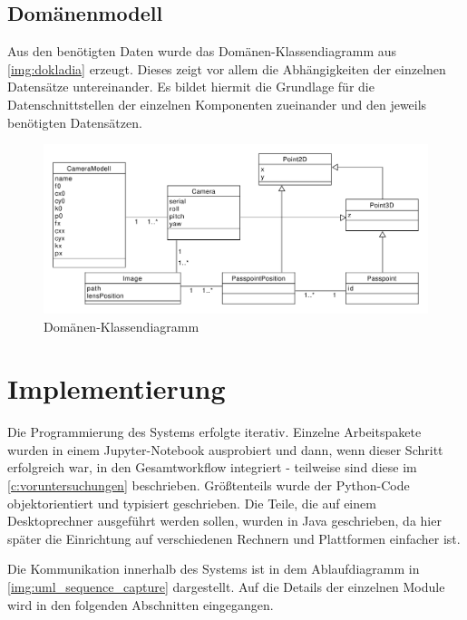 \documentclass[./00PhotoBox.tex]{subfiles}
\begin{document}
\subsection{Domänenmodell}

Aus den benötigten Daten wurde das Domänen-Klassendiagramm aus \autoref{img:dokladia} erzeugt. Dieses zeigt vor allem die Abhängigkeiten der einzelnen Datensätze untereinander. Es bildet hiermit die Grundlage für die Datenschnittstellen der einzelnen Komponenten zueinander und den jeweils benötigten Datensätzen.

\begin{figure}
  \centering
  \includegraphics[width=1\textwidth]{./img/uml/uml_domain.pdf}
  \caption{Domänen-Klassendiagramm} %
  \label{img:dokladia} %
\end{figure}

\section{Implementierung}
\label{sec:Implementierung}


Die Programmierung des Systems erfolgte iterativ. Einzelne Arbeitspakete wurden in einem Jupyter-Notebook ausprobiert und dann, wenn dieser Schritt erfolgreich war, in den Gesamtworkflow integriert - teilweise sind diese im \autoref{c:voruntersuchungen} beschrieben. Größtenteils wurde der Python-Code objektorientiert und typisiert geschrieben. Die Teile, die auf einem Desktoprechner ausgeführt werden sollen, wurden in Java geschrieben, da hier später die Einrichtung auf verschiedenen Rechnern und Plattformen einfacher ist.

Die Kommunikation innerhalb des Systems ist in dem Ablaufdiagramm in \autoref{img:uml_sequence_capture} dargestellt. Auf die Details der einzelnen Module wird in den folgenden Abschnitten eingegangen.
\end{document}
